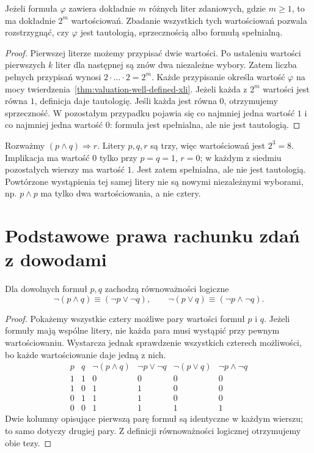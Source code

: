 \begin{twierdzenie}\label{thm:truth-table-decision-xli}
Jeżeli formuła $\varphi$ zawiera dokładnie $m$ różnych
liter zdaniowych, gdzie $m\ge1$, to ma dokładnie $2^m$
wartościowań. Zbadanie wszystkich tych wartościowań
pozwala rozstrzygnąć, czy $\varphi$ jest tautologią,
sprzecznością albo formułą spełnialną.
\end{twierdzenie}
\begin{proof}
Pierwszej literze możemy przypisać dwie wartości.
Po ustaleniu wartości pierwszych $k$ liter dla
następnej są znów dwa niezależne wybory. Zatem
liczba pełnych przypisań wynosi $2\cdot\ldots\cdot2=2^m$.
Każde przypisanie określa wartość $\varphi$ na mocy
twierdzenia~\ref{thm:valuation-well-defined-xli}.
Jeżeli każda z $2^m$ wartości jest równa $1$, definicja
daje tautologię. Jeśli każda jest równa $0$, otrzymujemy
sprzeczność. W pozostałym przypadku pojawia się co
najmniej jedna wartość $1$ i co najmniej jedna wartość $0$:
formuła jest spełnialna, ale nie jest tautologią.
\end{proof}

\begin{przyklad}
Rozważmy $(p\land q)\Rightarrow r$. Litery $p,q,r$
są trzy, więc wartościowań jest $2^3=8$. Implikacja
ma wartość $0$ tylko przy $p=q=1$, $r=0$;
w każdym z siedmiu pozostałych wierszy ma wartość $1$.
Jest zatem spełnialna, ale nie jest tautologią.
Powtórzone wystąpienia tej samej litery nie są
nowymi niezależnymi wyborami, np. $p\land p$
ma tylko dwa wartościowania, a nie cztery.
\end{przyklad}

\section{Podstawowe prawa rachunku zdań z dowodami}\label{sec:propositional-laws}
\begin{twierdzenie}\label{thm:de-morgan-logic}
Dla dowolnych formuł $p,q$ zachodzą równoważności logiczne
\[
\neg(p\land q)\equiv(\neg p\lor\neg q),\qquad
\neg(p\lor q)\equiv(\neg p\land\neg q).
\]
\end{twierdzenie}
\begin{proof}
Pokażemy wszystkie cztery możliwe pary wartości formuł
$p$ i $q$. Jeżeli formuły mają wspólne litery, nie każda
para musi wystąpić przy pewnym wartościowaniu. Wystarcza jednak
sprawdzenie wszystkich czterech możliwości, bo każde
wartościowanie daje jedną z nich.
\[
\begin{array}{cc|cc|cc}
p&q&\neg(p\land q)&\neg p\lor\neg q&
\neg(p\lor q)&\neg p\land\neg q\\\hline
1&1&0&0&0&0\\
1&0&1&1&0&0\\
0&1&1&1&0&0\\
0&0&1&1&1&1
\end{array}
\]
Dwie kolumny opisujące pierwszą parę formuł są identyczne
w każdym wierszu; to samo dotyczy drugiej pary.
Z definicji równoważności logicznej otrzymujemy obie tezy.
\end{proof}

